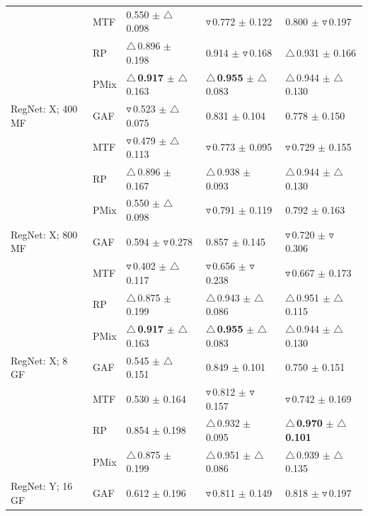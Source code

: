 \documentclass[final,3p,times,twocolumn]{elsarticle}
\newcommand{\purpole}[1]{\textcolor[rgb]{0.7,0.2,0.7}{#1}}
\begin{document}
\begin{table}[t!]
{\begin{tabular}{lllll}
 & MTF & 0.550 $\pm$ $\triangle$\,0.098 & $\triangledown$\,0.772 $\pm$ 0.122 & 0.800 $\pm$ $\triangledown$\,0.197 \\
 & RP & $\triangle$\,0.896 $\pm$ 0.198 & 0.914 $\pm$ $\triangledown$\,0.168 & $\triangle$\,0.931 $\pm$ 0.166 \\
 & \purpole{PMix} & \textbf{$\triangle$\,0.917} $\pm$ $\triangle$\,0.163 & \textbf{$\triangle$\,0.955} $\pm$ $\triangle$\,0.083 & $\triangle$\,0.944 $\pm$ $\triangle$\,0.130 \\
RegNet: X; 400 MF & GAF & $\triangledown$\,0.523 $\pm$ $\triangle$\,0.075 & 0.831 $\pm$ 0.104 & 0.778 $\pm$ 0.150 \\
 & MTF & $\triangledown$\,0.479 $\pm$ $\triangle$\,0.113 & $\triangledown$\,0.773 $\pm$ 0.095 & $\triangledown$\,0.729 $\pm$ 0.155 \\
 & RP & $\triangle$\,0.896 $\pm$ 0.167 & $\triangle$\,0.938 $\pm$ 0.093 & $\triangle$\,0.944 $\pm$ $\triangle$\,0.130 \\
 & \purpole{PMix} & 0.550 $\pm$ $\triangle$\,0.098 & $\triangledown$\,0.791 $\pm$ 0.119 & 0.792 $\pm$ 0.163 \\
RegNet: X; 800 MF & GAF & 0.594 $\pm$ $\triangledown$\,0.278 & 0.857 $\pm$ 0.145 & $\triangledown$\,0.720 $\pm$ $\triangledown$\,0.306 \\
 & MTF & $\triangledown$\,0.402 $\pm$ $\triangle$\,0.117 & $\triangledown$\,0.656 $\pm$ $\triangledown$\,0.238 & $\triangledown$\,0.667 $\pm$ 0.173 \\
 & RP & $\triangle$\,0.875 $\pm$ 0.199 & $\triangle$\,0.943 $\pm$ $\triangle$\,0.086 & $\triangle$\,0.951 $\pm$ $\triangle$\,0.115 \\
 & \purpole{PMix} & \textbf{$\triangle$\,0.917} $\pm$ $\triangle$\,0.163 & \textbf{$\triangle$\,0.955} $\pm$ $\triangle$\,0.083 & $\triangle$\,0.944 $\pm$ $\triangle$\,0.130 \\
RegNet: X; 8 GF & GAF & 0.545 $\pm$ $\triangle$\,0.151 & 0.849 $\pm$ 0.101 & 0.750 $\pm$ 0.151 \\
 & MTF & 0.530 $\pm$ 0.164 & $\triangledown$\,0.812 $\pm$ $\triangledown$\,0.157 & $\triangledown$\,0.742 $\pm$ 0.169 \\
 & RP & 0.854 $\pm$ 0.198 & $\triangle$\,0.932 $\pm$ 0.095 & \textbf{$\triangle$\,0.970} $\pm$ \textbf{$\triangle$\,0.101} \\
 & \purpole{PMix} & $\triangle$\,0.875 $\pm$ 0.199 & $\triangle$\,0.951 $\pm$ $\triangle$\,0.086 & $\triangle$\,0.939 $\pm$ $\triangle$\,0.135 \\
RegNet: Y; 16 GF & GAF & 0.612 $\pm$ 0.196 & $\triangledown$\,0.811 $\pm$ 0.149 & 0.818 $\pm$ $\triangledown$\,0.197 \\

\end{tabular}}
\end{table}
\end{document}
